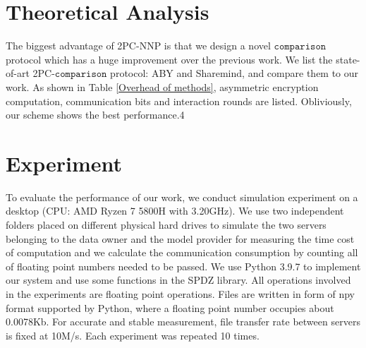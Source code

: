 \documentclass[letterpaper]{article} %
\begin{document}
    \section{Theoretical Analysis}
    \begin{table}[!ht]

        \center
        \caption{Overhead of different 2PC-comparison schemes for a $l$-bits value }
        \label{Overhead of methods}
    \end{table}
    The biggest advantage of 2PC-NNP is that we design a novel $\mathtt{comparison}$ protocol which has
    a huge improvement over the previous work.
    We list the state-of-art 2PC-$\mathtt{comparison}$ protocol:
    ABY and Sharemind, and compare them to our work.
    As shown in Table \ref{Overhead of methods}, asymmetric encryption computation, communication bits and
    interaction rounds are listed.
    Obliviously, our scheme shows the best performance.4


    \section{Experiment}
    To evaluate the performance of our work, we conduct simulation experiment on a desktop (CPU: AMD Ryzen 7 5800H with 3.20GHz).
    We use two independent folders placed on different physical hard drives to simulate the two servers belonging to the
    data owner and the model provider for measuring the time cost of computation
    and we calculate the communication consumption by counting all of floating point numbers needed to be passed.
    We use Python 3.9.7 to implement our system and use some functions in the SPDZ library.
    All operations involved in the experiments are floating point operations.
    Files are written in form of npy format supported by Python, where a floating point number occupies about 0.0078Kb.
    For accurate and stable measurement, file transfer rate between servers is fixed at 10M/s.
    Each experiment was repeated 10 times.
\end{document}
